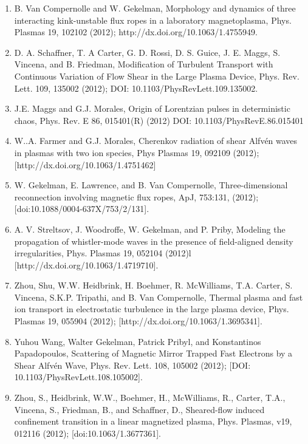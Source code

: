 \documentclass[11pt]{article}
\begin{document}
\begin{enumerate}
\item B. Van Compernolle and W. Gekelman, Morphology and dynamics of three interacting kink-unstable flux ropes in a laboratory magnetoplasma, Phys. Plasmas 19, 102102 (2012); http://dx.doi.org/10.1063/1.4755949.

\item D. A. Schaffner, T. A Carter, G. D. Rossi, D. S. Guice, J. E. Maggs, S. Vincena, and B. Friedman, Modification of Turbulent Transport with Continuous Variation of Flow Shear in the Large Plasma Device, Phys. Rev. Lett. 109, 135002 (2012); DOI: 10.1103/PhysRevLett.109.135002.

\item J.E. Maggs and G.J. Morales, Origin of Lorentzian pulses in deterministic chaos, Phys. Rev. E 86, 015401(R) (2012) DOI: 10.1103/PhysRevE.86.015401

\item  W..A. Farmer and G.J. Morales, Cherenkov radiation of shear Alfv\'{e}n waves in plasmas with two ion species, Phys Plasmas 19, 092109 (2012); [http://dx.doi.org/10.1063/1.4751462]

\item  W. Gekelman, E. Lawrence, and B. Van Compernolle, Three-dimensional reconnection involving magnetic flux ropes, ApJ, 753:131, (2012); [doi:10.1088/0004-637X/753/2/131].

\item  A. V. Streltsov, J. Woodroffe, W. Gekelman, and P. Priby, Modeling the propagation of whistler-mode waves in the presence of field-aligned density irregularities, Phys. Plasmas 19, 052104 (2012)l [http://dx.doi.org/10.1063/1.4719710].

\item  Zhou, Shu, W.W. Heidbrink, H. Boehmer, R. McWilliams, T.A. Carter, S. Vincena, S.K.P. Tripathi, and B. Van Compernolle, Thermal plasma and fast ion transport in electrostatic turbulence in the large plasma device, Phys. Plasmas  19, 055904 (2012); [http://dx.doi.org/10.1063/1.3695341].

\item  Yuhou Wang, Walter Gekelman, Patrick Pribyl, and Konstantinos Papadopoulos, Scattering of Magnetic Mirror Trapped Fast Electrons by a Shear Alfv\'{e}n Wave, Phys. Rev. Lett. 108, 105002 (2012); [DOI: 10.1103/PhysRevLett.108.105002].

\item   Zhou, S., Heidbrink, W.W., Boehmer, H., McWilliams, R., Carter, T.A., Vincena, S., Friedman, B., and Schaffner, D., Sheared-flow induced confinement transition in a linear magnetized plasma, Phys. Plasmas, v19, 012116 (2012); [doi:10.1063/1.3677361].


\end{enumerate}
\end{document}
